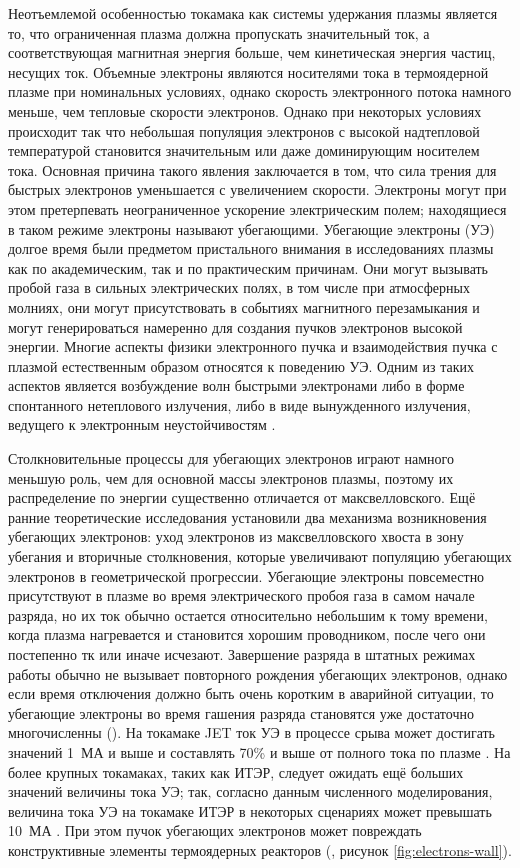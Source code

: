 
{\actuality}

Неотъемлемой особенностью токамака как системы удержания плазмы является то, что ограниченная плазма должна пропускать значительный ток, а соответствующая магнитная энергия больше, чем кинетическая энергия частиц, несущих ток. Объемные электроны являются носителями тока в термоядерной плазме при номинальных условиях, однако скорость электронного потока намного меньше, чем тепловые скорости электронов. Однако при некоторых условиях происходит так что небольшая популяция электронов с высокой надтепловой температурой становится значительным или даже доминирующим носителем тока. Основная причина такого явления заключается в том, что сила трения для быстрых электронов уменьшается с увеличением скорости. Электроны могут при этом претерпевать неограниченное ускорение электрическим полем; находящиеся в таком режиме электроны называют убегающими. Убегающие электроны (УЭ) долгое время были предметом пристального внимания в исследованиях плазмы как по академическим, так и по практическим причинам. Они могут вызывать пробой газа в сильных электрических полях, в том числе при атмосферных молниях, они могут присутствовать в событиях магнитного перезамыкания и могут генерироваться намеренно для создания пучков электронов высокой энергии. Многие аспекты физики электронного пучка и взаимодействия пучка с плазмой естественным образом относятся к поведению УЭ. Одним из таких аспектов является возбуждение волн быстрыми электронами либо в форме спонтанного нетеплового излучения, либо в виде вынужденного излучения, ведущего к электронным неустойчивостям \autocite{Breizman2019}.

Столкновительные процессы для убегающих электронов играют намного меньшую роль, чем для основной массы электронов плазмы, поэтому их распределение по энергии существенно отличается от максвелловского. Ещё ранние теоретические исследования установили два механизма возникновения убегающих электронов: уход электронов из максвелловского хвоста в зону убегания и вторичные столкновения, которые увеличивают популяцию убегающих электронов в геометрической прогрессии. Убегающие электроны повсеместно присутствуют в плазме во время электрического пробоя газа в самом начале разряда, но их ток обычно остается относительно небольшим к тому времени, когда плазма нагревается и становится хорошим проводником, после чего они постепенно тк или иначе исчезают. Завершение разряда в штатных режимах работы обычно не вызывает повторного рождения убегающих электронов, однако если время отключения должно быть очень коротким в аварийной ситуации, то убегающие электроны во время гашения разряда становятся уже достаточно многочисленны (\autocite{Breizman2019}). На токамаке JET ток УЭ в процессе срыва может достигать значений 1~МА и выше и составлять 70\% и выше от полного тока по плазме \autocite{Smith2006}. На более крупных токамаках, таких как ИТЭР, следует ожидать ещё больших значений величины тока УЭ; так, согласно данным численного моделирования, величина тока УЭ на токамаке ИТЭР в некоторых сценариях может превышать 10~МА \autocite{Smith2006}. При этом пучок убегающих электронов может повреждать конструктивные элементы термоядерных реакторов (\autocite{Bazylev2011}, рисунок \cref{fig:electrons-wall}).

